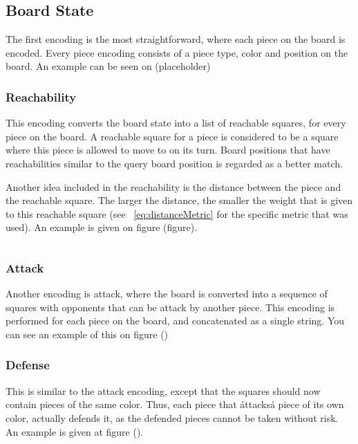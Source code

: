 \documentclass[11pt]{article}
\begin{document}
    \subsection{Board State}

    The first encoding is the most straightforward, where each piece on the board is encoded. Every piece encoding consists of a piece type, color and position on the board. An example can be seen on (placeholder)

    \subsubsection{Reachability}

    This encoding converts the board state into a list of reachable squares, for every piece on the board. A reachable square for a piece is considered to be a square where this piece is allowed to move to on its turn. Board positions that have reachabilities similar to the query board position is regarded as a better match.

    Another idea included in the reachability is the distance between the piece and the reachable square. The larger the distance, the smaller the weight that is given to this reachable square (see ~\eqref{eq:distanceMetric} for the specific metric that was used). An example is given on figure (figure).

    \begin{equation}
        \label{eq:distanceMetric}
    \end{equation}

    \subsubsection{Attack}

    Another encoding is attack, where the board is converted into a sequence of squares with opponents that can be attack by another piece. This encoding is performed for each piece on the board, and concatenated as a single string. You can see an example of this on figure ()

    \subsubsection{Defense}

    This is similar to the attack encoding, except that the squares should now contain pieces of the same color. Thus, each piece that \'attacks\' a piece of its own color, actually defends it, as the defended pieces cannot be taken without risk. An example is given at figure ().
\end{document}
